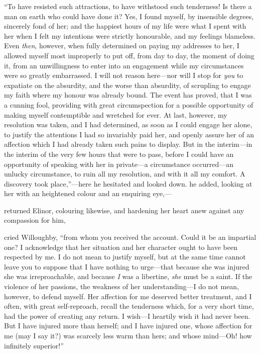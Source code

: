 “To have resisted such attractions, to have withstood such tenderness! Is there a man on earth who could have done it? Yes, I found myself, by insensible degrees, sincerely fond of her; and the happiest hours of my life were what I spent with her when I felt my intentions were strictly honourable, and my feelings blameless. Even {\em then}, however, when fully determined on paying my addresses to her, I allowed myself most improperly to put off, from day to day, the moment of doing it, from an unwillingness to enter into an engagement while my circumstances were so greatly embarrassed. I will not reason here---nor will I stop for {\em you} to expatiate on the absurdity, and the worse than absurdity, of scrupling to engage my faith where my honour was already bound. The event has proved, that I was a cunning fool, providing with great circumspection for a possible opportunity of making myself contemptible and wretched for ever. At last, however, my resolution was taken, and I had determined, as soon as I could engage her alone, to justify the attentions I had so invariably paid her, and openly assure her of an affection which I had already taken such pains to display. But in the interim---in the interim of the very few hours that were to pass, before I could have an opportunity of speaking with her in private---a circumstance occurred---an unlucky circumstance, to ruin all my resolution, and with it all my comfort. A discovery took place,”---here he hesitated and looked down.  he added, looking at her with an heightened colour and an enquiring eye,---

 returned Elinor, colouring likewise, and hardening her heart anew against any compassion for him, 

 cried Willoughby, “from whom you received the account. Could it be an impartial one? I acknowledge that her situation and her character ought to have been respected by me. I do not mean to justify myself, but at the same time cannot leave you to suppose that I have nothing to urge---that because she was injured she was irreproachable, and because {\em I} was a libertine, {\em she} must be a saint. If the violence of her passions, the weakness of her understanding---I do not mean, however, to defend myself. Her affection for me deserved better treatment, and I often, with great self-reproach, recall the tenderness which, for a very short time, had the power of creating any return. I wish---I heartily wish it had never been. But I have injured more than herself; and I have injured one, whose affection for me (may I say it?) was scarcely less warm than hers; and whose mind---Oh! how infinitely superior!”

